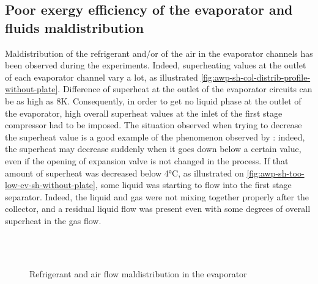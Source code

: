 \subsection{Poor exergy efficiency of the evaporator
  and fluids maldistribution}
\label{sec:awp-issue-reducing-oh}

Maldistribution of the refrigerant and/or of the air in the evaporator
channels has been observed during the experiments. Indeed,
superheating values at the outlet of each evaporator channel vary a
lot, as illustrated
\cref{fig:awp-sh-col-distrib-profile-without-plate}. Difference of
superheat at the outlet of the evaporator circuits can be as high as
8\si{\kelvin}. Consequently, in order to get no liquid phase at the
outlet of the evaporator, high overall superheat values at the inlet
of the first stage compressor had to be imposed. The situation
observed when trying to decrease the superheat value is a good example
of the phenomenon observed by \citet{chen-yezheng-2002a}: indeed, the
superheat may decrease suddenly when it goes down below a certain
value, even if the opening of expansion valve is not changed in the
process. If that amount of superheat was decreased below
4\si{\degreeCelsius}, as illustrated on
\cref{fig:awp-sh-too-low-ev-sh-without-plate}, some liquid was
starting to flow into the first stage separator. Indeed, the liquid
and gas were not mixing together properly after the collector, and a
residual liquid flow was present even with some degrees of overall
superheat in the gas flow.

\begin{figure}[htbp]
  \centering
  \hspace{1em}
  \\
  \hspace{1em}
  \\
  \hspace{0.5em}
  \hspace{5.8em}
  \hspace{5em}
  \caption{Refrigerant and air flow maldistribution in the evaporator}
  \label{fig:awp-maldistribution}
\end{figure}

